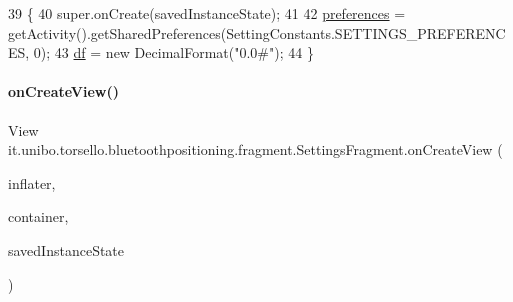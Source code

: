 \begin{DoxyCode}
39                                                     \{
40         super.onCreate(savedInstanceState);
41 
42         \hyperlink{classit_1_1unibo_1_1torsello_1_1bluetoothpositioning_1_1fragment_1_1SettingsFragment_a52480c4d5d81ca59fe4a98ae3c623ea4_a52480c4d5d81ca59fe4a98ae3c623ea4}{preferences} = getActivity().getSharedPreferences(SettingConstants.SETTINGS\_PREFERENCES, 
      0);
43         \hyperlink{classit_1_1unibo_1_1torsello_1_1bluetoothpositioning_1_1fragment_1_1SettingsFragment_af6b80a700dc80c39a56d001b68a47694_af6b80a700dc80c39a56d001b68a47694}{df} = \textcolor{keyword}{new} DecimalFormat(\textcolor{stringliteral}{"0.0#"});
44     \}
\end{DoxyCode}
\hypertarget{classit_1_1unibo_1_1torsello_1_1bluetoothpositioning_1_1fragment_1_1SettingsFragment_ac1c9d47777382cc2c74b7b1cf3d6ccd7_ac1c9d47777382cc2c74b7b1cf3d6ccd7}{}\label{classit_1_1unibo_1_1torsello_1_1bluetoothpositioning_1_1fragment_1_1SettingsFragment_ac1c9d47777382cc2c74b7b1cf3d6ccd7_ac1c9d47777382cc2c74b7b1cf3d6ccd7} 
\paragraph{\texorpdfstring{on\+Create\+View()}{onCreateView()}}
{\footnotesize\ttfamily View it.\+unibo.\+torsello.\+bluetoothpositioning.\+fragment.\+Settings\+Fragment.\+on\+Create\+View (\begin{DoxyParamCaption}\item[{Layout\+Inflater}]{inflater,  }\item[{View\+Group}]{container,  }\item[{Bundle}]{saved\+Instance\+State }\end{DoxyParamCaption})}



